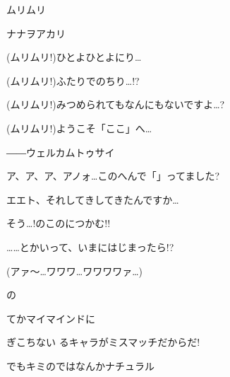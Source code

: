 \documentclass[a4paper,tate,twocolumn,12pt]{ltjtarticle}
\begin{document}
\thispagestyle{empty}

\begin{center}
{\LARGE ムリムリ}

{\large ナナヲアカリ}
\end{center}

\vspace{1em}

\begin{flushleft}

\noindent\begin{minipage}{\linewidth}
(ムリムリ!)ひとよひとよにり…

(ムリムリ!)ふたりでのちり…!?

(ムリムリ!)みつめられてもなんにもないですよ…?

(ムリムリ!)ようこそ「ここ」へ…

――ウェルカムトゥサイ
\end{minipage}

\vspace{2em}

\noindent\begin{minipage}{\linewidth}
ア、ア、ア、アノォ…このへんで「」ってました?

エエト、それしてきしてきたんですか…

そう…!のこのにつかむ!!

……とかいって、いまにはじまったら!?

(アァ～…ワワワ…ワワワワァ…)
\end{minipage}

\vspace{2em}

\noindent\begin{minipage}{\linewidth}
の

てかマイマインドに

ぎこちない るキャラがミスマッチだからだ!

でもキミのではなんかナチュラル
\end{minipage}


\end{flushleft}
\end{document}
